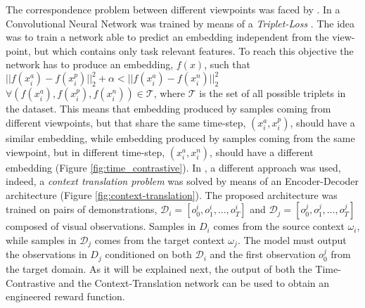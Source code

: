 
\newline The correspondence problem between different viewpoints was faced by \cite{sermanet2018time_contrastive,liu2018imitation_from_observation}. In \cite{sermanet2018time_contrastive} a Convolutional Neural Network was trained by means of a \textit{Triplet-Loss} \cite{schroff2015triplet_loss}. The idea was to train a network able to predict an embedding independent from the view-point, but which contains only task relevant features. To reach this objective the network has to produce an embedding, $f(x)$, such that $|| f(x^{a}_{i}) - f(x^{p}_{i})||^{2}_{2} + \alpha < || f(x^{a}_{i}) - f(x^{n}_{i})||^{2}_{2}$ $\forall (f(x^{a}_{i}), f(x^{p}_{i}), f(x^{n}_{i})) \in \mathcal{T}$, where $\mathcal{T}$ is the set of all possible triplets in the dataset. This means that embedding produced by samples coming from different viewpoints, but that share the same time-step, $(x^{a}_{i},x^{p}_{i})$, should have a similar embedding, while embedding produced by samples coming from the same viewpoint, but in different time-step, $(x^{a}_{i},x^{n}_{i})$, should have a different embedding (Figure \ref{fig:time_contrastive}). In \cite{liu2018imitation_from_observation}, a different approach was used, indeed, a \textit{context translation problem} was solved by means of an Encoder-Decoder architecture (Figure \ref{fig:context-translation}). The proposed architecture was trained on pairs of demonstrations, $\mathcal{D}_{i}=[o^{i}_{0},o^{i}_{1},\dots,o^{i}_{T}]$ and $\mathcal{D}_{j}=[o^{j}_{0},o^{j}_{1},\dots,o^{j}_{T}]$ composed of visual observations. Samples in $D_{i}$ comes from the source context $\omega_{i}$, while samples in $\mathcal{D}_{j}$ comes from the target context $\omega_{j}$. The model must output the observations in $D_{j}$ conditioned on both $\mathcal{D}_{i}$ and the first observation $o^{j}_{0}$ from the target domain. As it will be explained next, the output of both the Time-Contrastive and the Context-Translation network can be used to obtain an engineered reward function.


